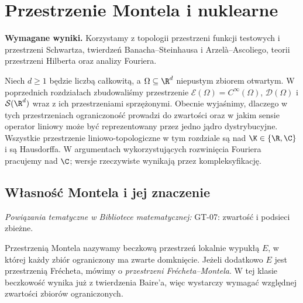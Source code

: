 
\section{Przestrzenie Montela i nuklearne}
\label{sec:montel-nuklearne23}

\providecommand{\atlasref}[2]{#2}


\noindent\textbf{Wymagane wyniki.} Korzystamy z topologii
przestrzeni funkcji testowych i przestrzeni Schwartza,
twierdzeń Banacha--Steinhausa i Arzelà--Ascoliego,
teorii przestrzeni Hilberta oraz analizy Fouriera.
\medskip

Niech $d\ge1$ będzie liczbą całkowitą, a $\Omega\subseteq\R^d$
niepustym zbiorem otwartym. W poprzednich rozdziałach
zbudowaliśmy przestrzenie
$\mathcal E(\Omega)=C^\infty(\Omega)$,
$\mathcal D(\Omega)$ i $\mathcal S(\R^d)$ wraz z ich
przestrzeniami sprzężonymi. Obecnie wyjaśnimy, dlaczego w tych
przestrzeniach ograniczoność prowadzi do zwartości oraz w jakim
sensie operator liniowy może być reprezentowany przez jedno jądro
dystrybucyjne. Wszystkie przestrzenie liniowo-topologiczne w tym
rozdziale są nad $\K\in\{\R,\C\}$ i są Hausdorffa. W argumentach
wykorzystujących rozwinięcia Fouriera pracujemy nad $\C$;
wersje rzeczywiste wynikają przez kompleksyfikację.

\subsection{Własność Montela i jej znaczenie}

\noindent\emph{Powiązania tematyczne w Bibliotece matematycznej:} \atlasref{GT-07::thm:topog-zwartosc-sieci}{GT-07: zwartość i podsieci zbieżne}.


\begin{definicja}
\label{def:montel23}
Przestrzenią Montela nazywamy beczkową przestrzeń lokalnie wypukłą
$E$, w której każdy zbiór ograniczony ma zwarte domknięcie.
Jeżeli dodatkowo $E$ jest przestrzenią Frécheta, mówimy o
\emph{przestrzeni Frécheta--Montela}. W tej klasie beczkowość
wynika już z twierdzenia Baire'a, więc wystarczy wymagać
względnej zwartości zbiorów ograniczonych.
\end{definicja}

